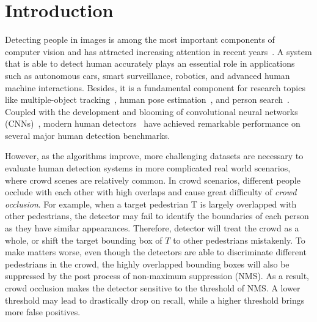 \documentclass[10pt,twocolumn,letterpaper]{article}
\begin{document}
\section{Introduction}
Detecting people in images is among the most important components of computer vision and has attracted increasing attention in recent years~\cite{zhang2016faster,li2015scale,zhang2015filtered,zhang2016far,hosang2015taking,dollar2009integral,dollar2014fast,dollar2009pedestrian,mao2017can}. 
A system that is able to detect human accurately plays an essential role in applications such as autonomous cars, smart surveillance, robotics, and advanced human machine interactions. Besides, it is a fundamental component for research topics like multiple-object tracking~\cite{mot2015}, human pose estimation~\cite{yilun2018cpn}, and person search~\cite{xiaotong2017cvpr}. Coupled with the development and blooming of convolutional neural networks (CNNs)~\cite{krizhevsky2012imagenet,simonyan2014very,he2016deep}, modern human detectors~\cite{cai2016unified,zhang2016faster,wang2018Repulsion} have achieved remarkable performance on several major human detection benchmarks. 

However, as the algorithms improve, more challenging datasets are necessary to evaluate human detection systems in more complicated real world scenarios, where crowd scenes are relatively common. In crowd scenarios, different people occlude with each other with high overlaps and cause great difficulty of \emph{crowd occlusion}. For example, when a target pedestrian T is largely overlapped with other pedestrians,  the detector may fail to identify the boundaries of each person as they have similar appearances. Therefore,  detector will treat the crowd as a whole, or shift the target bounding box of $T$ to other pedestrians mistakenly. To make matters worse, even though the detectors are able to discriminate different pedestrians in the crowd, the highly overlapped bounding boxes will also be suppressed by the post process of non-maximum suppression (NMS). As a result,  crowd occlusion makes the detector sensitive to the threshold of NMS. A lower threshold may lead to drastically drop on recall, while a higher threshold brings more false positives.

\end{document}
